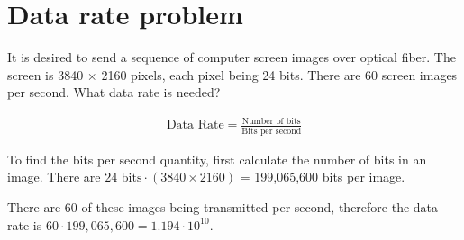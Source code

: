 
\section{Data rate problem}
It is desired to send a sequence of computer screen images over optical fiber. The screen is 3840 $\times$ 2160 pixels, each pixel being 24 bits. There are 60 screen images per second. What data rate is needed?

\begin{align*}
	\text{Data Rate} = \frac{\text{Number of bits}}{\text{Bits per second}}
\end{align*}

To find the bits per second quantity, first calculate the number of bits in an image. There are $24 \text{ bits} \cdot (3840 \times 2160)$ = 199,065,600 bits per image. 

There are 60 of these images being transmitted per second, therefore the data rate is $60 \cdot 199,065,600 = 1.194 \cdot 10^{10}$.

\section{}
\section{}
\section{}
\section{}
\section{}
\section{}
